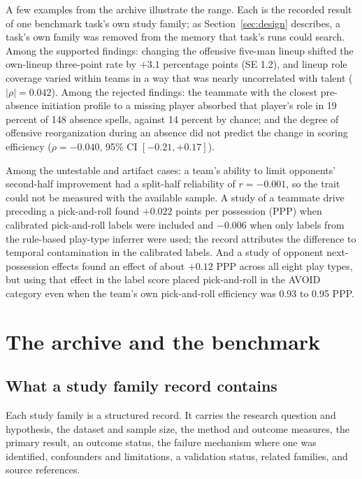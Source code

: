 \documentclass[11pt]{article}
\begin{document}
A few examples from the archive illustrate the range. Each is the recorded result of one benchmark task's own study family; as Section~\ref{sec:design} describes, a task's own family was removed from the memory that task's runs could search. Among the supported findings: changing the offensive five-man lineup shifted the own-lineup three-point rate by $+3.1$ percentage points (SE 1.2), and lineup role coverage varied within teams in a way that was nearly uncorrelated with talent ($|\rho| = 0.042$). Among the rejected findings: the teammate with the closest pre-absence initiation profile to a missing player absorbed that player's role in 19 percent of 148 absence spells, against 14 percent by chance; and the degree of offensive reorganization during an absence did not predict the change in scoring efficiency ($\rho = -0.040$, 95\% CI $[-0.21, +0.17]$).

Among the untestable and artifact cases: a team's ability to limit opponents' second-half improvement had a split-half reliability of $r = -0.001$, so the trait could not be measured with the available sample. A study of a teammate drive preceding a pick-and-roll found $+0.022$ points per possession (PPP) when calibrated pick-and-roll labels were included and $-0.006$ when only labels from the rule-based play-type inferrer were used; the record attributes the difference to temporal contamination in the calibrated labels. And a study of opponent next-possession effects found an effect of about $+0.12$ PPP across all eight play types, but using that effect in the label score placed pick-and-roll in the AVOID category even when the team's own pick-and-roll efficiency was 0.93 to 0.95 PPP.

\section{The archive and the benchmark}
\label{sec:archive}

\subsection{What a study family record contains}

Each study family is a structured record. It carries the research question and hypothesis, the dataset and sample size, the method and outcome measures, the primary result, an outcome status, the failure mechanism where one was identified, confounders and limitations, a validation status, related families, and source references.
\end{document}

